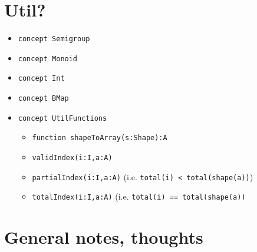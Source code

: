 \documentclass{article}
\begin{document}
\section{Util?}
\begin{itemize}
    \item \texttt{concept Semigroup}
    \item \texttt{concept Monoid}
    \item \texttt{concept Int}
    \item \texttt{concept BMap}
    \item \texttt{concept UtilFunctions}
    \begin{itemize}
        \item \texttt{function shapeToArray(s:Shape):A}
        \item \texttt{validIndex(i:I,a:A)}
        \item \texttt{partialIndex(i:I,a:A)} (i.e. \texttt{total(i) < total(shape(a))})
        \item \texttt{totalIndex(i:I,a:A)} (i.e. \texttt{total(i) == total(shape(a))}
    \end{itemize}
\end{itemize}

\section{General notes, thoughts}
\end{document}
